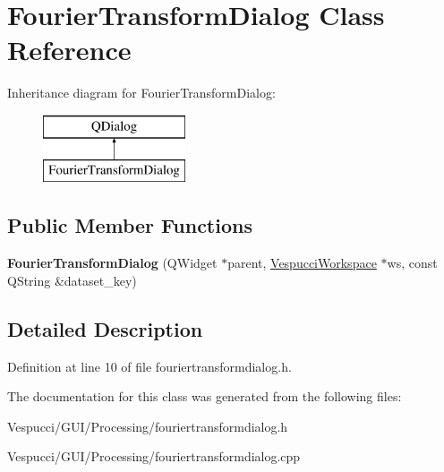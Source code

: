 \hypertarget{class_fourier_transform_dialog}{}\section{Fourier\+Transform\+Dialog Class Reference}
\label{class_fourier_transform_dialog}
Inheritance diagram for Fourier\+Transform\+Dialog\+:\begin{figure}[H]
\begin{center}
\leavevmode
\includegraphics[height=2.000000cm]{class_fourier_transform_dialog}
\end{center}
\end{figure}
\subsection*{Public Member Functions}
\begin{DoxyCompactItemize}
\item 
{\bfseries Fourier\+Transform\+Dialog} (Q\+Widget $\ast$parent, \hyperlink{class_vespucci_workspace}{Vespucci\+Workspace} $\ast$ws, const Q\+String \&dataset\+\_\+key)\hypertarget{class_fourier_transform_dialog_a4c5347a86c5fc9d701b489039ef0dd1c}{}\label{class_fourier_transform_dialog_a4c5347a86c5fc9d701b489039ef0dd1c}

\end{DoxyCompactItemize}


\subsection{Detailed Description}


Definition at line 10 of file fouriertransformdialog.\+h.



The documentation for this class was generated from the following files\+:\begin{DoxyCompactItemize}
\item 
Vespucci/\+G\+U\+I/\+Processing/fouriertransformdialog.\+h\item 
Vespucci/\+G\+U\+I/\+Processing/fouriertransformdialog.\+cpp\end{DoxyCompactItemize}
